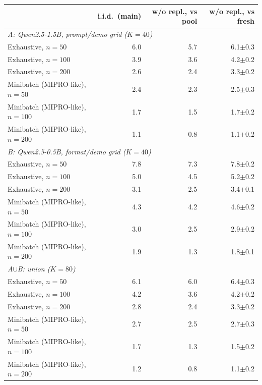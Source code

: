 \begin{tabular}{lrrr}\toprule
 & i.i.d.\ (main) & w/o repl., vs pool & w/o repl., vs fresh \\\midrule
\multicolumn{4}{l}{\emph{A: Qwen2.5-1.5B, prompt/demo grid ($K{=}40$)}} \\
Exhaustive, $n{=}50$ & 6.0 & 5.7 & 6.1$\pm$0.3 \\
Exhaustive, $n{=}100$ & 3.9 & 3.6 & 4.2$\pm$0.2 \\
Exhaustive, $n{=}200$ & 2.6 & 2.4 & 3.3$\pm$0.2 \\
Minibatch (MIPRO-like), $n{=}50$ & 2.4 & 2.3 & 2.5$\pm$0.3 \\
Minibatch (MIPRO-like), $n{=}100$ & 1.7 & 1.5 & 1.7$\pm$0.2 \\
Minibatch (MIPRO-like), $n{=}200$ & 1.1 & 0.8 & 1.1$\pm$0.2 \\
\multicolumn{4}{l}{\emph{B: Qwen2.5-0.5B, format/demo grid ($K{=}40$)}} \\
Exhaustive, $n{=}50$ & 7.8 & 7.3 & 7.8$\pm$0.2 \\
Exhaustive, $n{=}100$ & 5.0 & 4.5 & 5.2$\pm$0.2 \\
Exhaustive, $n{=}200$ & 3.1 & 2.5 & 3.4$\pm$0.1 \\
Minibatch (MIPRO-like), $n{=}50$ & 4.3 & 4.2 & 4.6$\pm$0.2 \\
Minibatch (MIPRO-like), $n{=}100$ & 3.0 & 2.5 & 2.9$\pm$0.2 \\
Minibatch (MIPRO-like), $n{=}200$ & 1.9 & 1.3 & 1.8$\pm$0.1 \\
\multicolumn{4}{l}{\emph{A$\cup$B: union ($K{=}80$)}} \\
Exhaustive, $n{=}50$ & 6.1 & 6.0 & 6.4$\pm$0.3 \\
Exhaustive, $n{=}100$ & 4.2 & 3.6 & 4.2$\pm$0.2 \\
Exhaustive, $n{=}200$ & 2.8 & 2.4 & 3.3$\pm$0.2 \\
Minibatch (MIPRO-like), $n{=}50$ & 2.7 & 2.5 & 2.7$\pm$0.3 \\
Minibatch (MIPRO-like), $n{=}100$ & 1.7 & 1.3 & 1.5$\pm$0.2 \\
Minibatch (MIPRO-like), $n{=}200$ & 1.2 & 0.8 & 1.1$\pm$0.2 \\
\bottomrule
\end{tabular}
